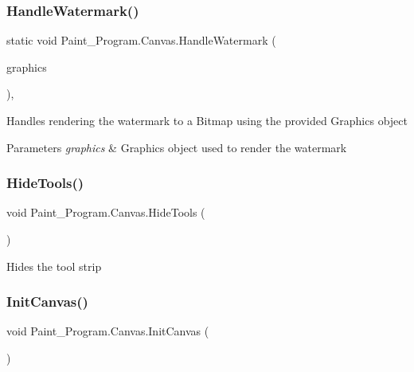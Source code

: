\subsubsection{\texorpdfstring{Handle\+Watermark()}{HandleWatermark()}}
{\footnotesize\ttfamily static void Paint\+\_\+\+Program.\+Canvas.\+Handle\+Watermark (\begin{DoxyParamCaption}\item[{Graphics}]{graphics }\end{DoxyParamCaption})\hspace{0.3cm}{\ttfamily [inline]}, {\ttfamily [static]}}



Handles rendering the watermark to a Bitmap using the provided Graphics object 


\begin{DoxyParams}{Parameters}
{\em graphics} & Graphics object used to render the watermark\\
\hline
\end{DoxyParams}
\mbox{\label{class_paint___program_1_1_canvas_a26985c4da349cdddbe1c91bfef8e1a10}} 
\subsubsection{\texorpdfstring{Hide\+Tools()}{HideTools()}}
{\footnotesize\ttfamily void Paint\+\_\+\+Program.\+Canvas.\+Hide\+Tools (\begin{DoxyParamCaption}{ }\end{DoxyParamCaption})\hspace{0.3cm}{\ttfamily [inline]}}



Hides the tool strip 

\mbox{\label{class_paint___program_1_1_canvas_ab2cd1e144d21d48fcd8e123df1b7214c}} 
\subsubsection{\texorpdfstring{Init\+Canvas()}{InitCanvas()}}
{\footnotesize\ttfamily void Paint\+\_\+\+Program.\+Canvas.\+Init\+Canvas (\begin{DoxyParamCaption}{ }\end{DoxyParamCaption})\hspace{0.3cm}{\ttfamily [inline]}}



